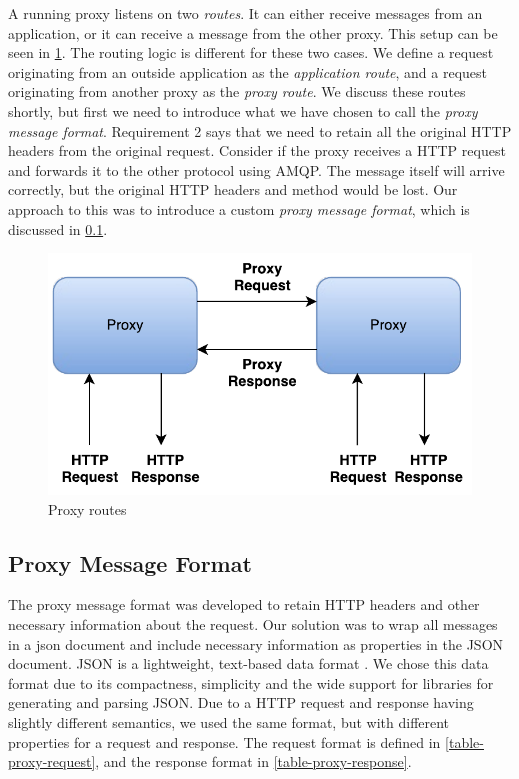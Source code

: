 A running proxy listens on two \textit{routes}. It can either receive messages
from an application, or it can receive a message from the other proxy. This
setup can be seen in \cref{figure:dil-routes}. The routing logic is different
for these two cases. We define a request originating from an outside application
as the \textit{application route}, and a request originating from another proxy
as the \textit{proxy route}. We discuss these routes shortly, but first we need to
introduce what we have chosen to call the \textit{proxy message format}.
Requirement 2 says that we need to retain all the original HTTP headers from the
original request. Consider if the proxy receives a HTTP request and forwards it
to the other protocol using AMQP. The message itself will arrive correctly, but
the original HTTP headers and method would be lost. Our approach to this was to
introduce a custom \textit{proxy message format}, which is discussed in
\cref{section:proxy-header-format}.

\begin{figure}[h]
\centering
\includegraphics[scale=0.7]{images/dil_routes.pdf}
\caption{Proxy routes}
\label{figure:dil-routes}
\end{figure}



\subsection{Proxy Message Format}
\label{section:proxy-header-format}

The proxy message format was developed to retain HTTP headers and other
necessary information about the request. Our solution was to wrap all messages
in a \gls{json} document and include necessary information as properties in the
JSON document. JSON is a lightweight, text-based data format \cite{rfc-json}. We
chose this data format due to its compactness, simplicity and the wide support
for libraries for generating and parsing JSON. Due to a HTTP request and
response having slightly different semantics, we used the same format, but
with different properties for a request and response. The request format is
defined in \cref{table-proxy-request}, and the response format in
\cref{table-proxy-response}.

